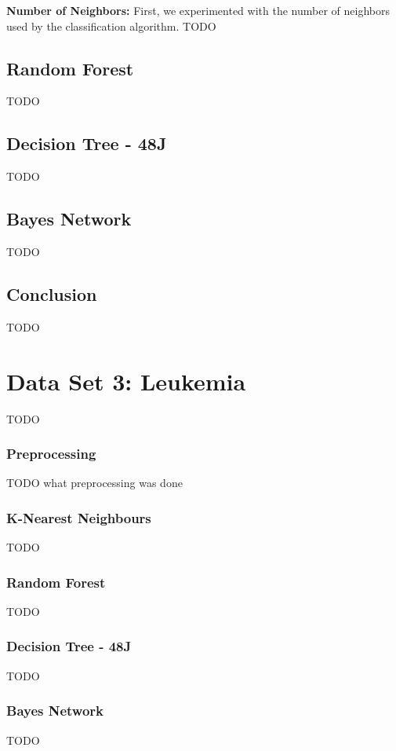 \documentclass{sig-alternate-05-2015}
\begin{document}
\textbf{Number of Neighbors:}
First, we experimented with the number of neighbors used by the classification algorithm. 
TODO\\
\subsection{Random Forest}
TODO\\
\subsection{Decision Tree - 48J}
TODO\\
\subsection{Bayes Network}
TODO\\
\subsection{Conclusion}
TODO\\


\section{Data Set 3: Leukemia}
TODO\\
\subsubsection{Preprocessing}
TODO what preprocessing was done\\
\subsubsection{K-Nearest Neighbours}
TODO\\
\subsubsection{Random Forest}
TODO\\
\subsubsection{Decision Tree - 48J}
TODO\\
\subsubsection{Bayes Network}
TODO\\
\end{document}
